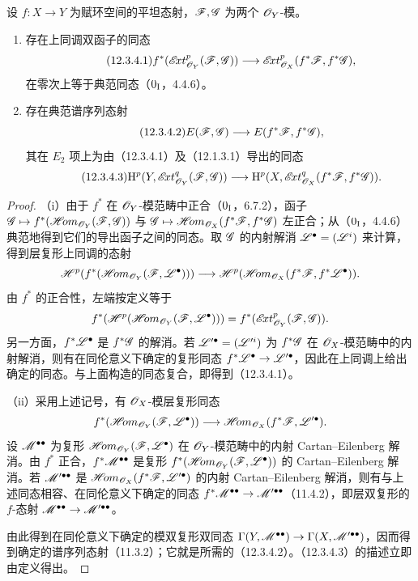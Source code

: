 设 $f:X\to Y$ 为赋环空间的平坦态射，$\mathscr F,\mathscr G$ 为两个 $\mathscr O_Y$-模。
\begin{enumerate}[label=(\roman*)]
\item 存在上同调双函子的同态
\begin{equation}\tag{12.3.4.1}
f^*(\mathscr{E}\!xt^p_{\mathscr O_Y}(\mathscr F,\mathscr G))
\longrightarrow\mathscr{E}\!xt^p_{\mathscr O_X}(f^*\mathscr F,f^*\mathscr G),
\end{equation}
在零次上等于典范同态（$0_{\mathrm I}$，4.4.6）。
\item 存在典范谱序列态射
\begin{equation}\tag{12.3.4.2}
E(\mathscr F,\mathscr G)\longrightarrow E(f^*\mathscr F,f^*\mathscr G),
\end{equation}
其在 $E_2$ 项上为由（12.3.4.1）及（12.1.3.1）导出的同态
\begin{equation}\tag{12.3.4.3}
\mathrm H^p(Y,\mathscr{E}\!xt^q_{\mathscr O_Y}(\mathscr F,\mathscr G))
\longrightarrow\mathrm H^p(X,\mathscr{E}\!xt^q_{\mathscr O_X}(f^*\mathscr F,f^*\mathscr G)).
\end{equation}
\end{enumerate}
\begin{proof}
（i）由于 $f^*$ 在 $\mathscr O_Y$-模范畴中正合（$0_{\mathrm I}$，6.7.2），函子 $\mathscr G\mapsto f^*(\mathscr{H}\!om_{\mathscr O_Y}(\mathscr F,\mathscr G))$ 与 $\mathscr G\mapsto\mathscr{H}\!om_{\mathscr O_X}(f^*\mathscr F,f^*\mathscr G)$ 左正合；从（$0_{\mathrm I}$，4.4.6）典范地得到它们的导出函子之间的同态。取 $\mathscr G$ 的内射解消 $\mathscr L^\bullet=(\mathscr L^i)$ 来计算，得到层复形上同调的态射
\[
\mathscr H^p(f^*(\mathscr{H}\!om_{\mathscr O_Y}(\mathscr F,\mathscr L^\bullet)))
\longrightarrow\mathscr H^p(\mathscr{H}\!om_{\mathscr O_X}(f^*\mathscr F,f^*\mathscr L^\bullet)).
\]
由 $f^*$ 的正合性，左端按定义等于
\[
f^*(\mathscr H^p(\mathscr{H}\!om_{\mathscr O_Y}(\mathscr F,\mathscr L^\bullet)))
=f^*(\mathscr{E}\!xt^p_{\mathscr O_Y}(\mathscr F,\mathscr G)).
\]
另一方面，$f^*\mathscr L^\bullet$ 是 $f^*\mathscr G$ 的解消。若 $\mathscr L'^\bullet=(\mathscr L'^i)$ 为 $f^*\mathscr G$ 在 $\mathscr O_X$-模范畴中的内射解消，则有在同伦意义下确定的复形同态 $f^*\mathscr L^\bullet\to\mathscr L'^\bullet$，因此在上同调上给出确定的同态。与上面构造的同态复合，即得到（12.3.4.1）。

（ii）采用上述记号，有 $\mathscr O_X$-模层复形同态
\[
f^*(\mathscr{H}\!om_{\mathscr O_Y}(\mathscr F,\mathscr L^\bullet))
\longrightarrow\mathscr{H}\!om_{\mathscr O_X}(f^*\mathscr F,\mathscr L'^\bullet).
\]
设 $\mathscr M^{\bullet\bullet}$ 为复形 $\mathscr{H}\!om_{\mathscr O_Y}(\mathscr F,\mathscr L^\bullet)$ 在 $\mathscr O_Y$-模范畴中的内射 Cartan--Eilenberg 解消。由 $f^*$ 正合，$f^*\mathscr M^{\bullet\bullet}$ 是复形 $f^*(\mathscr{H}\!om_{\mathscr O_Y}(\mathscr F,\mathscr L^\bullet))$ 的 Cartan--Eilenberg 解消。若 $\mathscr M'^{\bullet\bullet}$ 是 $\mathscr{H}\!om_{\mathscr O_X}(f^*\mathscr F,\mathscr L'^\bullet)$ 的内射 Cartan--Eilenberg 解消，则有与上述同态相容、在同伦意义下确定的同态 $f^*\mathscr M^{\bullet\bullet}\to\mathscr M'^{\bullet\bullet}$（11.4.2），即层双复形的 $f$-态射 $\mathscr M^{\bullet\bullet}\to\mathscr M'^{\bullet\bullet}$。

\begin{sloppypar}
由此得到在同伦意义下确定的模双复形双同态 $\Gamma(Y,\mathscr M^{\bullet\bullet})\to\Gamma(X,\mathscr M'^{\bullet\bullet})$，因而得到确定的谱序列态射（11.3.2）；它就是所需的（12.3.4.2）。（12.3.4.3）的描述立即由定义得出。
\end{sloppypar}
\end{proof}

